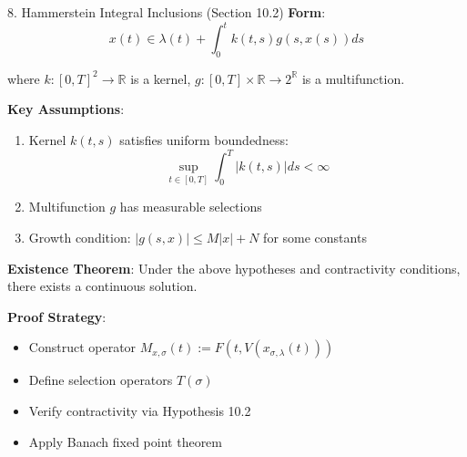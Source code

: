 \documentclass[aspectratio=169,10pt]{beamer}
\begin{document}
\begin{frame}[allowframebreaks]{8. Hammerstein Integral Inclusions (Section 10.2)}
    \textbf{Form}:
    $$x(t) \in \lambda(t) + \int_0^t k(t,s)g(s, x(s)) ds$$

    where $k: [0,T]^2 \to \mathbb{R}$ is a kernel, $g: [0,T] \times \mathbb{R} \to 2^{\mathbb{R}}$ is a multifunction.

    \vspace{0.4cm}
    \textbf{Key Assumptions}:
    \begin{enumerate}
        \item Kernel $k(t,s)$ satisfies uniform boundedness:
        $$\sup_{t \in [0,T]} \int_0^T |k(t,s)| ds < \infty$$
        \item Multifunction $g$ has measurable selections
        \item Growth condition: $|g(s,x)| \leq M|x| + N$ for some constants
    \end{enumerate}

    \vspace{0.4cm}
    \textbf{Existence Theorem}:
    Under the above hypotheses and contractivity conditions, there exists a continuous solution.

    \vspace{0.4cm}
    \textbf{Proof Strategy}:
    \begin{itemize}
        \item Construct operator $M_{x,\sigma}(t) := F(t, V(x_{\sigma,\lambda}(t)))$
        \item Define selection operators $T(\sigma)$
        \item Verify contractivity via Hypothesis 10.2
        \item Apply Banach fixed point theorem
    \end{itemize}
\end{frame}
\end{document}
